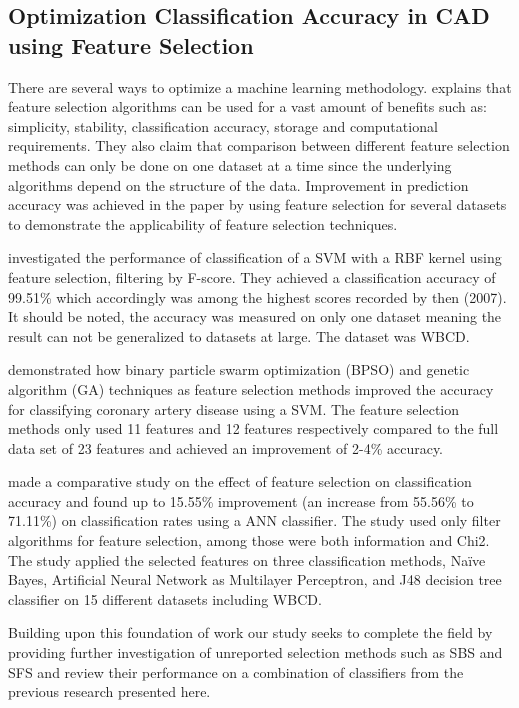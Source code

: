 \subsection{Optimization Classification Accuracy in CAD using Feature Selection}


There are several ways to optimize a machine learning methodology. \textcite{c201416} explains that feature selection algorithms can be used for a vast amount of benefits such as: simplicity, stability, classification accuracy, storage and computational requirements. They also claim that comparison between different feature selection methods can only be done on one dataset at a time since the underlying algorithms depend on the structure of the data. Improvement in prediction accuracy was achieved in the paper by using feature selection for several datasets to demonstrate the applicability of feature selection techniques.

\textcite{akay2009} investigated the performance of classification of a SVM with a RBF kernel using feature selection, filtering by F-score. They achieved a classification accuracy of 99.51\% which accordingly was among the highest scores recorded by then (2007). It should be noted, the accuracy was measured on only one dataset meaning the result can not be generalized to datasets at large. The dataset was WBCD.

\textcite{b20103177} demonstrated how  binary particle swarm optimization (BPSO) and genetic algorithm (GA) techniques as feature selection methods improved the accuracy for classifying coronary artery disease using a SVM. The feature selection methods only used 11 features and 12 features respectively compared to the full data set of 23 features and achieved an improvement of 2-4\% accuracy.

\textcite{karabulut2012} made a comparative study on the effect of feature selection on classification accuracy and found up to 15.55\% improvement (an increase from 55.56\% to 71.11\%) on classification rates using a ANN classifier. The study used only filter algorithms for feature selection, among those were both information and Chi2. The study applied the selected features on three classification methods, Naïve Bayes, Artificial Neural Network as Multilayer Perceptron, and J48 decision tree classifier on 15 different datasets including WBCD.

Building upon this foundation of work our study seeks to complete the field by providing further investigation of unreported selection methods such as SBS and SFS and review their performance on a combination of classifiers from the previous research presented here.
